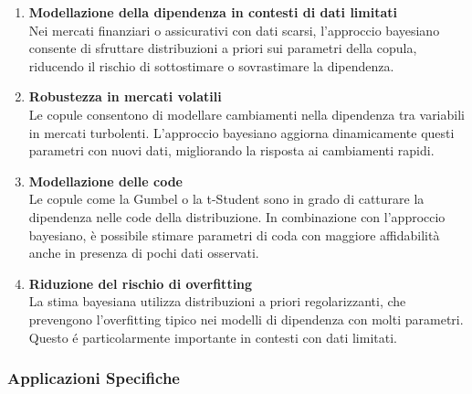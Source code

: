 \documentclass[%
	corpo=11pt,
    twoside,
    stile=classica,
    oldstyle,
    tipotesi=custom,
    greek,
    evenboxes,
]{toptesi}
\begin{document}
\begin{enumerate}
	\item \textbf{Modellazione della dipendenza in contesti di dati limitati} \\
	Nei mercati finanziari o assicurativi con dati scarsi, l’approccio bayesiano consente di sfruttare distribuzioni a priori sui parametri della copula, riducendo il rischio di sottostimare o sovrastimare la dipendenza.
	
	\item \textbf{Robustezza in mercati volatili} \\
	Le copule consentono di modellare cambiamenti nella dipendenza tra variabili in mercati turbolenti. L’approccio bayesiano aggiorna dinamicamente questi parametri con nuovi dati, migliorando la risposta ai cambiamenti rapidi.
	
	\item \textbf{Modellazione delle code} \\
	Le copule come la Gumbel o la t-Student sono in grado di catturare la dipendenza nelle code della distribuzione. In combinazione con l’approccio bayesiano, è possibile stimare parametri di coda con maggiore affidabilità anche in presenza di pochi dati osservati.
	
	\item \textbf{Riduzione del rischio di overfitting} \\
	La stima bayesiana utilizza distribuzioni a priori regolarizzanti, che prevengono l’overfitting tipico nei modelli di dipendenza con molti parametri. Questo é particolarmente importante in contesti
	con dati limitati.
\end{enumerate}

\subsubsection{Applicazioni Specifiche}
\end{document}
